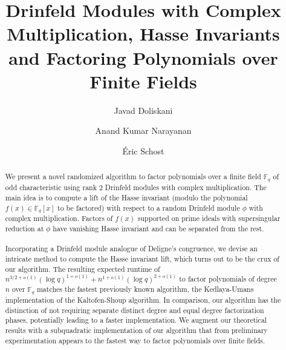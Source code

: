 \documentclass{article}
\title{Drinfeld Modules with Complex Multiplication, Hasse Invariants and Factoring Polynomials over Finite Fields}
\author[1]{Javad Doliskani}
\author[2]{Anand Kumar Narayanan}
\author[3]{\'Eric Schost}
\affil[1]{\small Institute for Quantum Computing, University of Waterloo}
\affil[2]{\small Computing and Mathematical Sciences, Caltech}
\affil[3]{\small Computer Science Department, University of Waterloo}
\date{}
\theoremstyle{plain}
\theoremstyle{definition}
\def\F{\ensuremath{\mathbb{F}}}
\begin{document}
\maketitle

\begin{abstract}
We present a novel randomized algorithm to factor polynomials over a finite field $\F_q$ of odd characteristic using rank $2$ Drinfeld modules with complex multiplication. The main idea is to compute a lift of the Hasse invariant (modulo the polynomial $f(x) \in \F_q[x]$ to be factored) with respect to a random Drinfeld module $\phi$ with complex multiplication. Factors of $f(x)$ supported on prime ideals with supersingular reduction at $\phi$ have vanishing Hasse invariant and can be separated from the rest.\\ \\


 Incorporating a Drinfeld module analogue of Deligne's congruence, we devise an intricate method to 
 compute the Hasse invariant lift, which turns out to be the crux of our algorithm. The resulting 
 expected runtime of $n^{3/2+o(1)} (\log q)^{1+o(1)}+n^{1+o(1)} (\log q)^{2+o(1)}$ to factor 
 polynomials of degree $n$ over $\F_q$ matches the fastest previously known algorithm, the 
 Kedlaya-Umans implementation of the Kaltofen-Shoup algorithm. In comparison, our algorithm has the 
 distinction of not requiring separate distinct degree and equal degree factorization phases, 
 potentially leading to a faster implementation. We augment our theoretical results with a 
 subquadratic implementation of our algorithm that from preliminary experimentation appears to the 
 fastest way to factor polynomials over finite fields.

 
\end{abstract}
\end{document}
